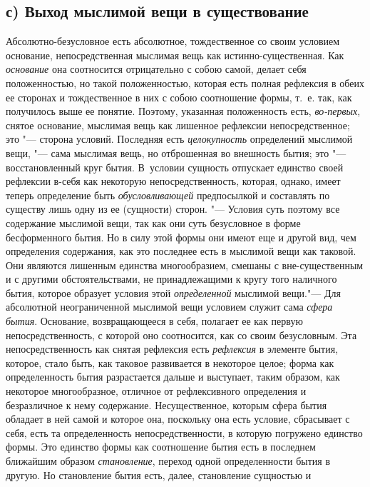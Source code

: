 \subsection%
[с) Выход мыслимой вещи в существование]%
{с) Выход мыслимой вещи в существование}

Абсолютно-безусловное есть абсолютное,
тождественное со своим условием основание, непосредственная мыслимая вещь
как истинно-существенная. Как {\em основание} она
соотносится отрицательно с собою самой, делает себя положенностью, но такой
положенностью, которая есть полная рефлексия в обеих ее сторонах и
тождественное в них с собою соотношение формы, т.~е. так, как получилось
выше ее понятие. Поэтому, указанная положенность есть,
{\em во-первых}, снятое основание, мыслимая вещь как
лишенное рефлексии непосредственное; это "--- сторона условий. Последняя есть
{\em целокупность} определений мыслимой вещи, "--- сама
мыслимая вещь, но отброшенная во внешность бытия; это "--- восстановленный
круг бытия. В~условии сущность отпускает единство своей рефлексии в-себя
как некоторую непосредственность, которая, однако, имеет теперь определение
быть {\em обусловливающей} предпосылкой и составлять по
существу лишь одну из ее (сущности) сторон. "--- Условия суть поэтому все
содержание мыслимой вещи, так как они суть безусловное в форме
бесформенного бытия. Но в силу этой формы они имеют еще и другой вид, чем
определения содержания, как это последнее есть в мыслимой вещи как таковой.
Они являются лишенным единства многообразием, смешаны с вне-существенным и
с другими обстоятельствами, не принадлежащими к кругу того наличного бытия,
которое образует условия этой {\em определенной}
мыслимой вещи."--- Для абсолютной неограниченной мыслимой вещи условием служит
сама {\em сфера бытия}. Основание, возвращающееся в
себя, полагает ее как первую непосредственность, с которой оно соотносится,
как со своим безусловным. Эта непосредственность как снятая рефлексия есть
{\em рефлексия} в элементе бытия, которое, стало быть,
как таковое развивается в некоторое целое; форма как определенность бытия
разрастается дальше и выступает, таким образом, как некоторое
многообразное, отличное от рефлексивного определения и безразличное к нему
содержание. Несущественное, которым сфера бытия обладает в ней самой и
которое она, поскольку она есть условие, сбрасывает с себя, есть та
определенность непосредственности, в которую погружено единство формы. Это
единство формы как соотношение бытия есть в последнем ближайшим образом
{\em становление}, переход одной определенности бытия в
другую. Но становление бытия есть, далее, становление сущностью и
